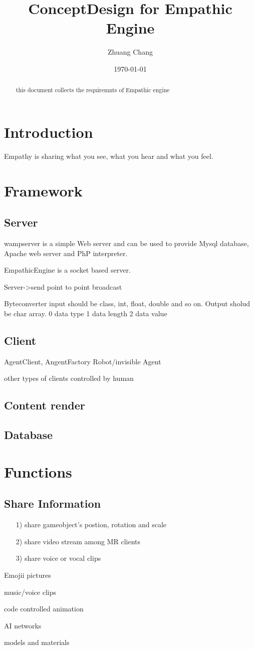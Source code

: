 \documentclass{article}
\begin{document}
\title{ConceptDesign for Empathic Engine}
\author{Zhuang Chang}
\date{\today}
\maketitle
\begin{abstract}
this document collects the requiremnts of Empathic engine

\end{abstract}
\tableofcontents

\section{Introduction}
Empathy is sharing what you see, what you hear and what you
feel.
\section{Framework}
\subsection{Server}

wampserver is a simple Web server and can be  used
to provide Mysql database, Apache web server and PhP
interpreter.

EmpathicEngine is a socket based server.


Server->send
point to point 
broadcast

Byteconverter input should be class, int, float, double and so on. Output sholud be char array.
0 data type
1 data length
2 data value
\subsection{Client}
AgentClient, AngentFactory
Robot/invisible Agent

other types of clients controlled by human
\subsection{Content render}

\subsection{Database}
\section{Functions}
\subsection{Share Information}
\begin{enumerate}
    \item [1)]share gameobject's postion, rotation and scale
    \item [2)]share video stream among MR clients
    \item [3)]share voice or vocal clips
\end{enumerate}
Emojii pictures

music/voice clips

code controlled animation

AI networks

models and materials
\end{document}
